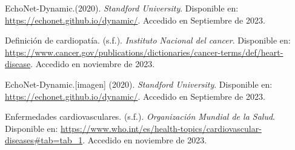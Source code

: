 \documentclass[runningheads]{llncs}
\begin{document}
%
%
% 
% 
%
\begin{thebibliography}{99}


EchoNet-Dynamic.(2020). \textit{Standford University}. Disponible en: 
\url{https://echonet.github.io/dynamic/}. 
Accedido en Septiembre de 2023.

Definición de cardiopatía. (s.f.). \textit{Instituto Nacional del cancer}. Disponible en: 
\url{https://www.cancer.gov/publications/dictionaries/cancer-terms/def/heart-disease}. 
Accedido en noviembre de 2023.

EchoNet-Dynamic.[imagen] (2020). \textit{Standford University}. Disponible en: 
\url{https://echonet.github.io/dynamic/}. 
Accedido en Septiembre de 2023.


Enfermedades cardiovasculares. (s.f.). \textit{Organización Mundial de la Salud}. Disponible en: 
\url{https://www.who.int/es/health-topics/cardiovascular-diseases#tab=tab_1}. 
Accedido en noviembre de 2023.


\end{thebibliography}
\end{document}
